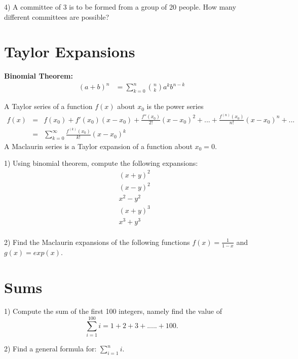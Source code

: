 \documentclass[12pt,a4paper,titlepage]{article}\usepackage[]{graphicx}\usepackage[]{color}
\begin{document}
4) A committee of 3 is to be formed from a group of 20 people. How many different committees are possible?

\vspace{1cm}



\section{Taylor Expansions}


\textbf{Binomial Theorem:}
\begin{align}
(a+b)^{n}&=\sum_{k=0}^{n}{n \choose k} a^{k} b^{n-k}
\end{align}

A Taylor series of a function $ f(x) $ about $ x_0 $ is the power series
\begin{eqnarray}
f(x)&=&f(x_0)+f'(x_0)(x-x_0)+\frac{f''(x_0)}{2!}(x-x_0)^{2}+...+\frac{f^{(n)}(x_0)}{n!}(x-x_0)^{n}+... \\
&=& \sum_{k=0}^\infty \frac{f^{(k)}(x_0)}{k!}(x-x_0)^{k}
\end{eqnarray}
A Maclaurin series is a Taylor expansion of a function about $ x_0=0 $.\newline

1) Using binomial theorem, compute the following expansions:
\begin{align*}
 &(x+y)^{2}  \\
 &(x-y)^{2}\\
 &x^{2}-y^{2}\\
 &(x+y)^{3} \\
 &x^{3}+y^{3}\\
\end{align*}

2) Find the Maclaurin expansions of the following functions
$ f(x)=\frac{1}{1-x} $ and $ g(x)=exp(x)$.


\vspace{1cm}



\section{Sums}

1) Compute the sum of the first 100 integers, namely find the value of
$$
\sum_{i=1}^{100} i =1 +2 + 3+ .....+100.
$$

2) Find a general formula for: $\sum_{i=1}^n i$.
\end{document}
